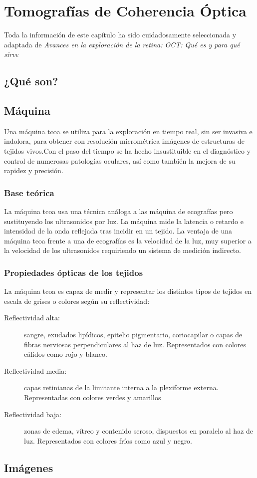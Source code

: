 \chapter{Tomografías de Coherencia Óptica}
Toda la información de este capítulo ha sido cuidadosamente
seleccionada y adaptada de \emph{Avances en la exploración de la
  retina: OCT: Qué es y para qué sirve}\cite{oct-bib}
\section{¿Qué son?}
\section{Máquina }
Una máquina \gls{tcoa} se utiliza para la exploración en tiempo real, sin ser
invasiva e indolora, para obtener con resolución micrométrica imágenes
de estructuras de tejidos vivos.Con el paso del tiempo se ha hecho
insustituible en el diagnóstico y control de numerosas patologías
oculares, así como también la mejora de su rapidez y precisión.
\subsection{Base teórica}
La máquina \gls{tcoa} usa una técnica análoga a las máquina de ecografías
pero sustituyendo los ultrasonidos por luz. La máquina mide la
latencia o retardo e intensidad de la onda reflejada tras incidir en
un tejido. La ventaja de una máquina \gls{tcoa} frente a una de ecografías es
la velocidad de la luz, muy superior a la velocidad de los
ultrasonidos requiriendo un sistema de medición indirecto.
\subsection{Propiedades ópticas de los tejidos}
La máquina \gls{tcoa} es capaz de medir y representar los distintos
tipos de tejidos en escala de grises o colores según su reflectividad:
\begin{description}
\item[Reflectividad alta:] sangre, exudados lipídicos, epitelio pigmentario,
coriocapilar o capas de fibras nerviosas perpendiculares al haz de
luz. Representados con colores cálidos como rojo y blanco.
\item[Reflectividad media:] capas retinianas de la limitante interna a la
plexiforme externa. Representadas con colores verdes y amarillos
\item[Reflectividad baja:] zonas de edema, vítreo y contenido seroso,
dispuestos en paralelo al haz de luz. Representados con colores fríos
como azul y negro.
\end{description}
\section{Imágenes }